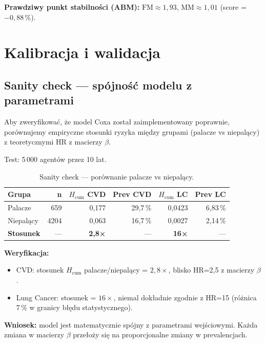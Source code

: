 \documentclass[11pt,a4paper]{article}
\newcommand{\cum}[1][]{H_{\mathrm{cum}#1}}
\begin{document}
\textbf{Prawdziwy punkt stabilności (ABM):} $\mathrm{FM} \approx 1{,}93$, $\mathrm{MM} \approx 1{,}01$ (score = $-0{,}88\,\%$).

\newpage
\section{Kalibracja i walidacja}
\label{sec:kalibracja}

\subsection{Sanity check --- spójność modelu z parametrami}

Aby zweryfikować, że model Coxa został zaimplementowany poprawnie, porównujemy empiryczne stosunki ryzyka między grupami (palacze vs niepalący) z teoretycznymi HR z macierzy $\beta$.

Test: 5\,000 agentów przez 10 lat.

\begin{table}[h]
\centering
\small
\begin{tabular}{lrrrrr}
\toprule
\textbf{Grupa} & \textbf{n} & \textbf{$\cum$ CVD} & \textbf{Prev CVD} & \textbf{$\cum$ LC} & \textbf{Prev LC} \\
\midrule
Palacze      & 659  & 0{,}177 & 29{,}7\,\% & 0{,}0423 & 6{,}83\,\% \\
Niepalący    & 4204 & 0{,}063 & 16{,}7\,\% & 0{,}0027 & 2{,}14\,\% \\
\midrule
\textbf{Stosunek} & --- & \textbf{2{,}8×} & --- & \textbf{16×} & --- \\
\bottomrule
\end{tabular}
\caption{Sanity check --- porównanie palacze vs niepalący.}
\end{table}

\textbf{Weryfikacja:}
\begin{itemize}
  \item CVD: stosunek $\cum$ palacze/niepalący = $2{,}8\times$, blisko HR=2{,}5 z macierzy $\beta$. \checkmark
  \item Lung Cancer: stosunek = \textbf{$16\times$}, niemal dokładnie zgodnie z HR=15 (różnica 7\,\% w granicy błędu statystycznego). \checkmark
\end{itemize}

\textbf{Wniosek:} model jest matematycznie spójny z parametrami wejściowymi. Każda zmiana w macierzy $\beta$ przełoży się na proporcjonalne zmiany w prevalencjach.
\end{document}
